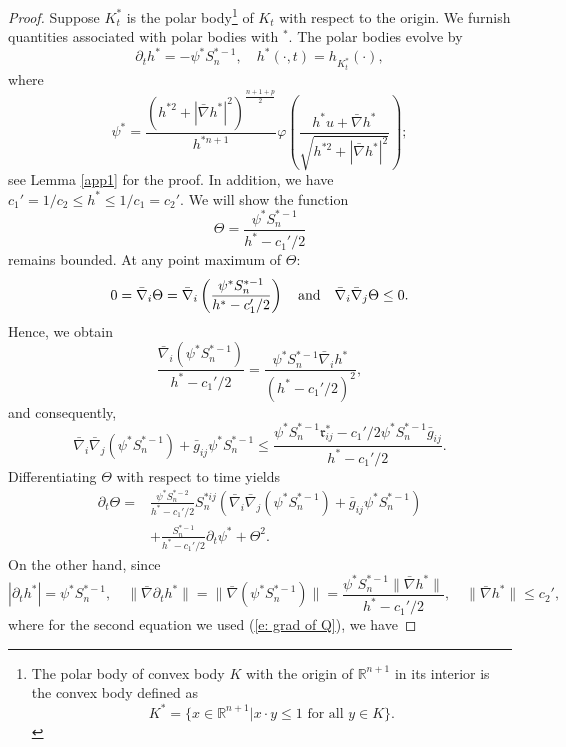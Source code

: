 \documentclass{amsart}
\theoremstyle{definition}
\theoremstyle{remark}
\numberwithin{equation}{section}
\begin{document}
\begin{proof}
Suppose $K_t^{\ast}$ is the polar body\footnote{The polar body of convex body $K$ with the origin of $\mathbb{R}^{n+1}$ in its interior is the convex body defined as
\[K^{\ast}=\{x\in\mathbb{R}^{n+1}| x\cdot y\leq 1 \mbox{~for~all~}y\in K\}.\]} of $K_t$ with respect to the origin. We furnish quantities associated with polar bodies with $^\ast$. The polar bodies evolve by
$$\partial_th^{\ast}=-\psi^{\ast} S_{n}^{\ast-1},\quad h^{\ast}(\cdot,t)=h_{K_{t}^{\ast}}(\cdot),$$
where $$\psi^{\ast}=\frac{(h^{\ast2}+|\bar{\nabla}h^{\ast}|^2)^{\frac{n+1+p}{2}}}{h^{\ast n+1}}\varphi\left(\frac{h^{\ast}u+\bar{\nabla} h^{\ast}}{\sqrt{h^{\ast2}+|\bar{\nabla}h^{\ast}|^2}}\right);$$
see Lemma \ref{app1} for the proof.
In addition, we have $c_1'=1/c_2\leq h^{\ast}\leq 1/c_1=c_2'.$ We will show  the function
\[\Theta=\frac{\psi^{\ast} S_{n}^{\ast-1}}{h^{\ast}-c_1'/2}\]
remains bounded.
At any point maximum of $\Theta:$
\[0=\bar{\nabla}_i\Theta=\bar{\nabla}_i \left(\frac{\psi^{\ast} S_{n}^{\ast-1}}{h^{\ast}-c_1'/2}\right)\ \ \ {\hbox{and}}\ \ \  \bar{\nabla}_i\bar{\nabla}_j \Theta\leq 0.\]
Hence, we obtain
\begin{equation}\label{e: grad of Q}
\frac{\bar{\nabla}_i (\psi^{\ast} S_{n}^{\ast-1})}{h^{\ast}-c_1'/2}=\frac{\psi^{\ast} S_{n}^{\ast-1} \bar{\nabla}_i h^{\ast}}{(h^{\ast}-c_1'/2)^2},
\end{equation}
and consequently,
\begin{equation}\label{e: tso}
\bar{\nabla}_i\bar{\nabla}_j(\psi^{\ast} S_{n}^{\ast-1})+\bar{g}_{ij}\psi^{\ast} S_{n}^{\ast-1}\leq
\frac{\psi^{\ast} S_{n}^{\ast-1}\mathfrak{r}_{ij}^{\ast}-c_1'/2\psi^{\ast} S_{n}^{\ast-1}
\bar{g}_{ij}}{h^{\ast}-c_1'/2}.
\end{equation}
Differentiating $\Theta$ with respect to time yields
\begin{align*}
\partial_t\Theta=&\frac{\psi^{\ast}S_n^{\ast -2}}{h^{\ast}-c_1'/2}S_n^{\ast ij}
\left(\bar{\nabla}_i\bar{\nabla}_j(\psi^{\ast} S_{n}^{\ast-1})+\bar{g}_{ij}
\psi^{\ast} S_{n}^{\ast-1}\right)\\
&+\frac{S_{n}^{\ast-1}}{h^{\ast}-c_1'/2}\partial_t \psi^{\ast}+\Theta^2.
\end{align*}
On the other hand, since
\[|\partial_t h^{\ast}|=\psi^{\ast} S_{n}^{\ast-1},\quad \|\bar{\nabla}\partial_t h^{\ast}\|=\|\bar{\nabla}(\psi^{\ast} S_{n}^{\ast-1})\|=\frac{\psi^{\ast} S_{n}^{\ast-1} \|\bar{\nabla} h^{\ast}\|}{h^{\ast}-c_1'/2},\quad\|\bar{\nabla} h^{\ast}\|\leq c_2',\]
where for the second equation we used (\ref{e: grad of Q}),  we have

\end{proof}
\end{document}
